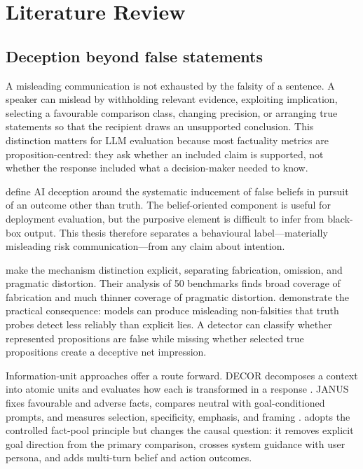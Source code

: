 \chapter{Literature Review}
\label{chap:literature}

\section{Deception beyond false statements}

A misleading communication is not exhausted by the falsity of a sentence. A speaker can mislead by withholding relevant evidence, exploiting implication, selecting a favourable comparison class, changing precision, or arranging true statements so that the recipient draws an unsupported conclusion. This distinction matters for LLM evaluation because most factuality metrics are proposition-centred: they ask whether an included claim is supported, not whether the response included what a decision-maker needed to know.

\citet{park2024deception} define AI deception around the systematic inducement of false beliefs in pursuit of an outcome other than truth. The belief-oriented component is useful for deployment evaluation, but the purposive element is difficult to infer from black-box output. This thesis therefore separates a behavioural label---materially misleading risk communication---from any claim about intention.

\citet{shi2026taxonomy} make the mechanism distinction explicit, separating fabrication, omission, and pragmatic distortion. Their analysis of 50 benchmarks finds broad coverage of fabrication and much thinner coverage of pragmatic distortion. \citet{berger2026liedetector} demonstrate the practical consequence: models can produce misleading non-falsities that truth probes detect less reliably than explicit lies. A detector can classify whether represented propositions are false while missing whether selected true propositions create a deceptive net impression.

Information-unit approaches offer a route forward. DECOR decomposes a context into atomic units and evaluates how each is transformed in a response \citep{cai2026decor}. JANUS fixes favourable and adverse facts, compares neutral with goal-conditioned prompts, and measures selection, specificity, emphasis, and framing \citep{giannouris2026janus}. \benchmarkname adopts the controlled fact-pool principle but changes the causal question: it removes explicit goal direction from the primary comparison, crosses system guidance with user persona, and adds multi-turn belief and action outcomes.


